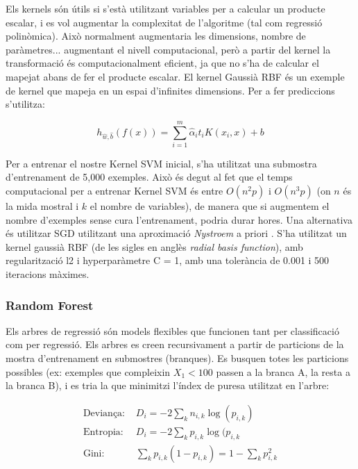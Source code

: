 \documentclass[12pt, spanish]{article}
\begin{document}
Els kernels són útils si s'està utilitzant variables per a calcular un producte escalar, i es vol augmentar la complexitat de l'algoritme (tal com regressió polinòmica). Això normalment augmentaria les dimensions, nombre de paràmetres... augmentant el nivell computacional, però a partir del kernel la transformació és computacionalment eficient, ja que no s'ha de calcular el mapejat abans de fer el producte escalar. El kernel Gaussià RBF és un exemple de kernel que mapeja en un espai d'infinites dimensions. Per a fer prediccions s'utilitza:

$$
h_{\hat{w}, \hat{b}}(f(x)) = \sum^m_{i = 1} \hat{\alpha}_i t_i K(x_i, x) + b
$$

Per a entrenar el nostre Kernel SVM inicial, s'ha utilitzat una submostra d'entrenament de 5,000 exemples. Això és degut al fet que el temps computacional per a entrenar Kernel SVM és entre $O(n^2 p)$  i $O(n^3 p)$ (on $n$ és la mida mostral i $k$ el nombre de variables), de manera que si augmentem el nombre d'exemples sense cura l'entrenament, podria durar hores. Una alternativa és utilitzar SGD utilitzant una aproximació \textit{Nystroem} a priori \cite{sklearn}. S'ha utilitzat un kernel gaussià RBF (de les sigles en anglès \textit{radial basis function}), amb regularització l2 i hyperparàmetre C = 1, amb una tolerància de 0.001 i 500 iteracions màximes. 

\subsubsection{Random Forest}

Els arbres de regressió són models flexibles que funcionen tant per classificació com per regressió. Els arbres es creen recursivament a partir de particions de la mostra d'entrenament en submostres (branques). Es busquen totes les particions possibles (ex: exemples que compleixin $X_1 < 100$ passen a la branca A, la resta a la branca B), i es tria la que minimitzi l'índex de puresa utilitzat en l'arbre:

\begin{equation} 
\begin{split}
\text{Deviança: } & D_i = -2 \sum_k n_{i,k} \log(p_{i,k}) \\
\text{Entropia: }&  D_i = -2 \sum_k p_{i,k}\log(p_{i,k}\\
\text{Gini: }& \sum_k p_{i,k}(1 - p_{i,k}) = 1 - \sum_k p_{i,k}^2
\end{split}
\end{equation}
\end{document}
